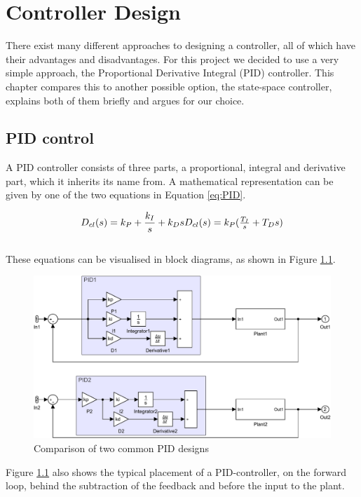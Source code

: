 \chapter{Controller Design}\label{ch:controldesign}
There exist many different approaches to designing a controller,
all of which have their advantages and disadvantages.
For this project we decided to use a very simple approach,
the Proportional Derivative Integral (PID) controller.
This chapter compares this to another possible option,
the state-space controller, explains both of them briefly
and argues for our choice.

\section{PID control}\label{sec:PID}
A PID controller consists of three parts,
a proportional, integral and derivative part,
which it inherits its name from.
A mathematical representation can be given by one of the two equations in Equation \ref{eq:PID}.

\begin{equation}
	  D_{cl}(s) = k_P + \frac{k_I}{s} + k_D s$$
	$$D_{cl}(s) = k_P ( \frac{T_I}{s} + T_D s)
	 \label{eq:PID}
\end{equation} \cite{Franklin2014}\\
These equations can be visualised in block diagrams, as shown in Figure \ref{fig:twoPID}.
\begin{figure}[H]
    \centering
    \includegraphics[width=\textwidth]{figures/07controllerDesign/PID_explicit.pdf}
    \caption{Comparison of two common PID designs}
	\label{fig:twoPID}
\end{figure}

Figure \ref{fig:twoPID} also shows the typical placement of a PID-controller,
on the forward loop, behind the subtraction of the feedback and before the input to the plant.

